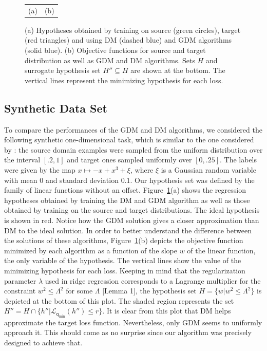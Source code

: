 \documentclass[twoside,11pt]{article}
\newcommand{\cL}{{\mathcal L}}
\newcommand{\1}{\mat{1}}
\newcommand{\qq}{{\mathsf q}}
\newcommand{\qmin}{{\qq_\text{min}}}
\begin{document}
\begin{figure}[t]
\begin{tabular}{cc}
(a)&(b)
\end{tabular}
\caption{(a) Hypotheses obtained by training on source
(green circles), target (red triangles) and using DM (dashed
blue) and GDM algorithms (solid blue). (b) Objective functions
for source and target distribution as well as  GDM and DM
algorithms. Sets $H$ and surrogate hypothesis set $H'' \subseteq H$
are shown at the bottom. The vertical lines represent the minimizing
hypothesis for each loss.}
\label{fig:classifiers}
\end{figure}

\subsection{Synthetic Data Set}

To compare the performances of the GDM and DM algorithms, we
considered the following synthetic one-dimensional task, which is
similar to the one considered by
\cite{HuangSmolaGrettonBorgwardtScholkopf2006}: the source domain
examples were sampled from the uniform distribution over the interval
$[.2, 1]$ and target ones sampled uniformly over $[0, .25]$. The
labels were given by the map $x \mapsto -x + x^3 + \xi$, where $\xi$
is a Gaussian random variable with mean $0$ and standard deviation
$0.1$. Our hypothesis set was defined by the family of linear
functions without an offset. Figure~\ref{fig:classifiers}(a) shows the
regression hypotheses obtained by training the DM and GDM algorithm as
well as those obtained by training on the source and target
distributions. The ideal hypothesis is shown in red.  Notice how the
GDM solution gives a closer approximation than DM to the ideal
solution.  In order to better understand the difference between the
solutions of these algorithms, Figure~\ref{fig:classifiers}(b) depicts the
objective function minimized by each algorithm as a function of the
slope $w$ of the linear function, the only variable of the
hypothesis. The vertical lines show the value of the minimizing
hypothesis for each loss. Keeping in mind that the regularization
parameter $\lambda$ used in ridge regression corresponds to a Lagrange
multiplier for the constraint $w^2 \leq \Lambda^2$ for some $\Lambda$
\citep{CortesMohri2013} [Lemma 1], the hypothesis set
$H = \{ w | w^2 \leq \Lambda^2\}$ is depicted at the bottom of this
plot.  The shaded region represents the set
$H'' = H \cap \{h'' |\cL_{\qmin} (h'') \leq r \}$. It is clear from
this plot that DM helps approximate the target loss
function. Nevertheless, only GDM seems to uniformly approach it. This
should come as no surprise since our algorithm was precisely designed
to achieve that.
\end{document}

